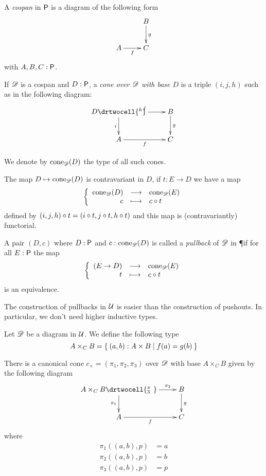 \begin{defn}
  A \emph{cospan} in $\P$ is a diagram of the following form
  \[\xymatrix{& B \ar^g[d] \\ A \ar_f[r] & C}\]
  with $A,B,C:\P$.
\end{defn}

\begin{defn}
  If $\Ddiag$ is a cospan and $D:\P$, a \emph{cone over $\Ddiag$ with
    base $D$} is a triple $(i,j,h)$ such as in the following diagram:
  \[\uppercurveobject{{ }}\lowercurveobject{{ }}\twocellhead{{ }}
  \xymatrix{D \ar^j[r] \ar_i[d] \drtwocell{^h} & B \ar^g[d] \\
    A \ar_f[r] & C
  }\]

  We denote by $\cone{\Ddiag}{D}$ the type of all such cones.
\end{defn}

The map $D\mapsto\cone{\Ddiag}{D}$ is contravariant in $D$, if $t:E\to{}D$ we
have a map
\[\function{\cone{\Ddiag}{D}}{\cone{\Ddiag}{E}}{c}{\composecone{t}{c}}\]
defined by $\composecone{t}{(i,j,h)}=(i\circ{}t,j\circ{}t,h\circ{}t)$ and this
map is (contravariantly) functorial.

\begin{defn}
  A pair $(D,c)$ where $D:\P$ and $c:\cone{\Ddiag}{D}$ is called a
  \emph{pullback} of $\Ddiag$ in \P if for all $E:\P$ the map
  \[\function{(E\to{}D)}{\cone{\Ddiag}{E}}{t}{\composecone{t}{c}}\]
  is an equivalence.
\end{defn}

The construction of pullbacks in $\type$ is easier than the construction of
pushouts.
In particular, we don't need higher inductive types.

\begin{defn}
  Let $\Ddiag$ be a diagram in $\type$. We define the following type
  \[A\times_CB=\setof{(a,b):A\times{}B | f(a) = g(b)}\]

  There is a canonical cone $c_\times=(\pi_1,\pi_2,\pi_3)$ over $\Ddiag$ with
  base $A\times_CB$ given by the following diagram
  \[\uppercurveobject{{ }}\lowercurveobject{{ }}\twocellhead{{ }}
  \xymatrix{A\times_CB \ar^-{\pi_2}[r] \ar_{\pi_1}[d] \drtwocell{^\pi_3\ }
    & B \ar^g[d] \\ A \ar_f[r] & C}\]
  where
  \begin{align*}
    \pi_1((a,b),p)&=a\\
    \pi_2((a,b),p)&=b\\
    \pi_3((a,b),p)&=p\\
  \end{align*}
\end{defn}

